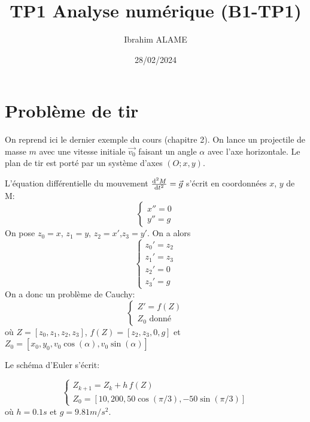 \documentclass{article}
\title{TP1 Analyse numérique (B1-TP1)}
\author{Ibrahim ALAME}
\date{28/02/2024}
\def \de {{\rm d}}
\begin{document}
\maketitle

\section{Problème de tir}  
  On reprend ici le dernier exemple du cours (chapitre 2). On lance un projectile de masse $m$ avec une vitesse initiale $\vec{v_0}$ faisant un angle $\alpha$ avec l'axe horizontale. Le plan de tir est porté par un système d'axes $(O;x,y)$.
\begin{center}
 \end{center}

 L'équation différentielle du mouvement $\frac{\de^2 M}{\de t^2}=\vec g$ s'écrit  en coordonnées $x$, $y$ de M: 
  \[\left\{\begin{array}{l}
  x''=0\\
  y''=g
  \end{array}\right.\]
  On pose $z_0=x$, $z_1=y$, $z_2=x'$,$z_3=y'$. On a alors
  \[\left\{\begin{array}{l}
  z_0'=z_2\\
  z_1'=z_3\\
  z_2'=0\\
  z_3'=g
  \end{array}\right.\]
  On a donc un problème de Cauchy:
  \[\left\{\begin{array}{l}
  Z'=f(Z)\\
  Z_0 \mbox{ donné}
  \end{array}\right.\]
  où $Z=[z_0,z_1,z_2,z_3]$, $f(Z)=[z_2,z_3,0,g]$ et $Z_0=[x_0,y_0,v_0\cos(\alpha),v_0\sin(\alpha)]$
  
  Le schéma d'Euler s'écrit:
  
  \[\left\{\begin{array}{l}
  Z_{k+1}=Z_k+h\,f(Z)\\
  Z_0 =[10,200,50\cos(\pi/3),-50\sin(\pi/3)]
  \end{array}\right.\]
  où $h=0.1s$ et $g=9.81 m/s^2$.
  
\end{document}
